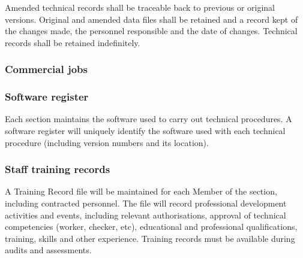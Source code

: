 Amended technical records shall be traceable back to previous or original versions. Original and amended data files shall be retained and a record kept of the changes made, the personnel responsible and the date of changes.
Technical records shall be retained indefinitely.

\subsubsection{Commercial jobs}

\subsubsection{Software register}
Each section maintains the software used to carry out technical procedures. 
A software register will uniquely identify the software used with each technical procedure (including version numbers and its location). 

\subsubsection{Staff training records}
\label{sss:training_records}
A Training Record file will be maintained for each Member of the section, including contracted personnel. The file will record professional development activities and events, including relevant authorisations, approval of technical competencies (worker, checker, etc), educational and professional qualifications, training, skills and other experience. 
Training records must be available during audits and assessments. 

